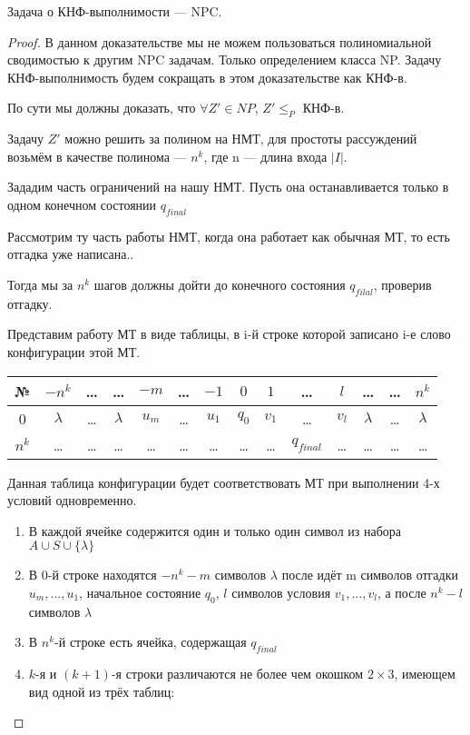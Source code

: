 \begin{theorem}
Задача о КНФ-выполнимости --- NPC.
\end{theorem}
\begin{proof}
В данном доказательстве мы не можем пользоваться полиномиальной сводимостью к
другим NPC задачам. Только определением класса NP. Задачу КНФ-выполнимость будем
сокращать в этом доказательстве как КНФ-в.

По сути мы должны доказать, что $\forall Z' \in NP$,  $Z' \le_P$ КНФ-в. 

Задачу $Z'$ можно решить за полином на НМТ, для простоты рассуждений возьмём в
качестве полинома --- $n^k$, где n --- длина входа  $|I|$. 

Зададим часть ограничений на нашу НМТ. Пусть она останавливается только в одном
конечном состоянии $q_{final}$

Рассмотрим ту часть работы НМТ, когда она работает как обычная МТ, то есть
отгадка уже написана..

Тогда мы за $n^k$ шагов должны дойти до конечного состояния $q_{filal}$,
проверив отгадку.

Представим работу МТ в виде таблицы, в i-й строке которой записано i-е слово
конфигурации этой МТ.
\begin{table}[htpb]
	\centering
	\label{tab:label}
	\begin{tabular}{|c|c|c|c| c|c|c |c|c|c| c|c|c|c|}
\hline №&$-n^k$& \ldots&\ldots& $-m$& \ldots&$-1$&$0$& $1$ &\ldots&$l$&
		\ldots& \ldots&$n^k$\\
		\hline
		      0&$\lambda$ & \ldots &
		      $\lambda$&$u_m$&\ldots&$u_1$&$q_0$&$v_1$&\ldots&$v_l$
			       &$\lambda$& \ldots&$\lambda$\\\hline
\hline
$n^k$&\ldots&\ldots&\ldots&\ldots&\ldots&\ldots&\ldots&\ldots&$q_{final}$&\ldots&\ldots&\ldots&\ldots\\\hline
	\end{tabular}
\end{table}

Данная таблица конфигурации будет соответствовать МТ при выполнении 4-х условий
одновременно.
\begin{enumerate}
	\item В каждой ячейке содержится один и только один символ из набора $A
		\cup S \cup \{\lambda\}$
	\item В 0-й строке находятся $-n^k - m$ символов  $\lambda$ после идёт m
		символов отгадки $u_m, \ldots, u_1$, начальное состояние $q_0$,  $l$ символов
		условия $v_1, \ldots, v_l$, а после  $n^k-l$ символов  $\lambda$
	\item В $n^k$-й строке есть ячейка, содержащая $q_{final}$
	\item $k$-я и $(k+1)$-я строки различаются не более чем окошком $2\times
		3$, имеющем вид одной из трёх таблиц:


\end{enumerate}
\end{proof}
